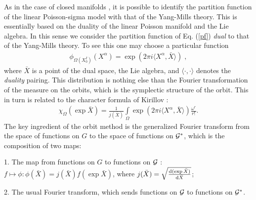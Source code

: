 \documentclass[a4paper,twoside,11pt]{article}
\numberwithin{equation}{section}
\begin{document}
As in the case of closed manifolds \cite{HS}, 
it is possible to identify the partition function of the linear Poisson-sigma model with that of 
the Yang-Mills theory. This is essentially based on the duality of the linear Poisson manifold and 
the Lie algebra. 
In this sense we consider the partition function of Eq. (\ref{pf}) {\it dual} to that of the Yang-Mills theory. To see this one may choose a particular function
\begin{gather}
\phi_{\Omega(X^I_0)}(X^\alpha)=\exp(2\pi i\langle X^\alpha,\bar{X}\rangle)\;,
\end{gather}
where $\bar{X}$ is a point of the dual space, the Lie algebra, and $\langle\cdot,\cdot\rangle$ denotes the {\it duality}
pairing. This distribution is nothing else than the Fourier 
transformation of the measure on the orbits, which is the symplectic structure of the orbit. 
This in turn is related to the character formula of Kirillov \cite{KL}:
\begin{gather}
\chi_\Omega(\exp\bar{X})=\frac{1}{j(\bar{X})}\int\limits_\Omega\exp(2\pi i\langle X^\alpha,\bar{X}\rangle)
\frac{\omega^r}{r!}.
\end{gather}
The key ingredient of the orbit method \cite{KL} is the generalized Fourier transform from the space 
of functions on $G$ to the space of functions on $\mathcal{G}^\ast$, which is the composition of two maps:

1. The map from functions on $G$ to functions on $\mathcal{G}$ : $f\mapsto\phi:\phi(\bar{X})=j(\bar{X})
f(\exp\bar{X})$, where $j(\bar{X})=\sqrt{\frac{\mathrm d(\exp\bar{X})}{\mathrm d\bar{X}}}$;

2. The usual Fourier transform, which sends functions on $\mathcal{G}$ to functions on $\mathcal{G}^\ast$.
\end{document}
